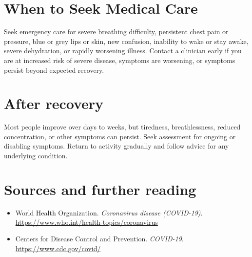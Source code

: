\section*{When to Seek Medical Care}
Seek emergency care for severe breathing difficulty, persistent chest pain or pressure, blue or grey lips or skin, new confusion, inability to wake or stay awake, severe dehydration, or rapidly worsening illness. Contact a clinician early if you are at increased risk of severe disease, symptoms are worsening, or symptoms persist beyond expected recovery.

\section*{After recovery}
Most people improve over days to weeks, but tiredness, breathlessness, reduced concentration, or other symptoms can persist. Seek assessment for ongoing or disabling symptoms. Return to activity gradually and follow advice for any underlying condition.

\section*{Sources and further reading}
\begin{itemize}
    \item World Health Organization. \textit{Coronavirus disease (COVID-19)}. \url{https://www.who.int/health-topics/coronavirus}
    \item Centers for Disease Control and Prevention. \textit{COVID-19}. \url{https://www.cdc.gov/covid/}
\end{itemize}

